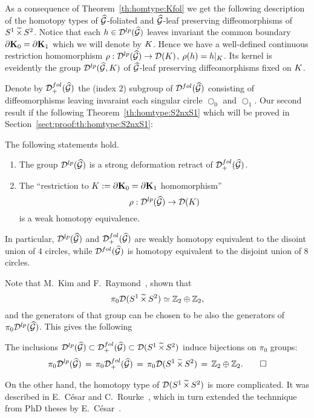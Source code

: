 As a consequence of Theorem~\ref{th:homtype:Kfol} we get the following description of the homotopy types of $\widehat{\mathcal{G}}$-foliated and $\widehat{\mathcal{G}}$-leaf preserving diffeomorphisms of $S^1\,\widetilde{\times}\,S^2$.
Notice that each $h\in\mathcal{D}^{lp}(\widehat{\mathcal{G}})$ leaves invariant the common boundary $\partial\mathbf{K}_0=\partial\mathbf{K}_1$ which we will denote by $K$.
Hence we have a well-defined continuous restriction homomorphism $\rho:\mathcal{D}^{lp}(\widehat{\mathcal{G}}) \to \mathcal{D}(K)$, $\rho(h)=h|_{K}$.
Its kernel is eveidently the group $\mathcal{D}^{lp}(\widehat{\mathcal{G}},K)$ of $\widehat{\mathcal{G}}$-leaf preserving diffeomorphisms fixed on $K$.

Denote by $\mathcal{D}^{fol}_{+}(\widehat{\mathcal{G}})$ the (index $2$) subgroup of $\mathcal{D}^{fol}(\widehat{\mathcal{G}})$ consisting of diffeomorphisms leaving invaraint each singular circle $\Circle_0$ and $\Circle_1$.
Our second result if the following Theorem~\ref{th:homtype:S2nxS1} which will be proved in Section~\ref{sect:proof:th:homtype:S2nxS1}:
\begin{theorem}\label{th:homtype:S2nxS1}
The following statements hold.
\begin{enumerate}[label={\rm(\arabic*)}, leftmargin=*]
\item\label{enum:th:homtype:S2nxS1:lp_fol_def_retr} 
The group $\mathcal{D}^{lp}(\widehat{\mathcal{G}})$ is a strong deformation retract of $\mathcal{D}^{fol}_{+}(\widehat{\mathcal{G}})$.
\item\label{enum:th:homtype:S2nxS1:Dlp_DK} 
The ``restriction to $K:=\partial\mathbf{K}_0=\partial\mathbf{K}_1$ homomorphism'' 
\[
    \rho:\mathcal{D}^{lp}(\widehat{\mathcal{G}}) \to \mathcal{D}(K)
\]
is a weak homotopy equivalence.
\end{enumerate}
In particular, $\mathcal{D}^{lp}(\widehat{\mathcal{G}})$ and $\mathcal{D}^{fol}_{+}(\widehat{\mathcal{G}})$ are weakly homotopy equivalent to the disoint union of $4$ circles, while $\mathcal{D}^{fol}(\widehat{\mathcal{G}})$ is homotopy equivalent to the disjoint union of $8$ circles.
\end{theorem}

Note that M.~Kim and F.~Raymond~\cite{KimRaymond:TrAMS:1990}, shown that 
\[ 
    \pi_0\mathcal{D}(S^1\,\widetilde{\times}\,S^2) \simeq \mathbb{Z}_2\oplus\mathbb{Z}_2,
\]
and the generators of that group can be chosen to be also the generators of $\pi_0\mathcal{D}^{lp}(\widehat{\mathcal{G}})$.
This gives the following
\begin{corollary}
The inclusions $\mathcal{D}^{lp}(\widehat{\mathcal{G}}) \subset \mathcal{D}^{fol}_{+}(\widehat{\mathcal{G}}) \subset \mathcal{D}(S^1\,\widetilde{\times}\,S^2)$ induce bijections on $\pi_0$ groups:
\[
\pi_0\mathcal{D}^{lp}(\widehat{\mathcal{G}}) \, = \, \pi_0\mathcal{D}^{fol}_{+}(\widehat{\mathcal{G}}) \, = \, \pi_0\mathcal{D}(S^1\,\widetilde{\times}\,S^2) \, = \, \mathbb{Z}_2\oplus\mathbb{Z}_2.
\qedhere
\]
\end{corollary}
On the other hand, the homotopy type of $\mathcal{D}(S^1\,\widetilde{\times}\,S^2)$ is more complicated.
It was described in E.~C\'{e}sar and C.~Rourke~\cite[Theorem~2]{CesarRourke:BAMS:1979}, which in turn extended the technnique from PhD theses by E.~C\'{e}sar~\cite{Cesar:Theses:1977}.


